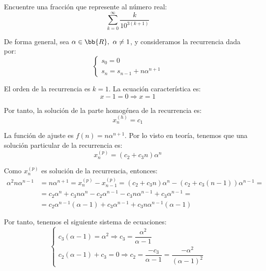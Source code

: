 \begin{ejercicio}
    Encuentre una fracción que represente al número real:
    \begin{equation*}
        \sum_{k=0}^{\infty} \dfrac{k}{10^{3(k+1)}}
    \end{equation*}

    De forma general, sea $\alpha\in \bb{R},~\alpha\neq 1$, y consideramos la recurrencia dada por:
    \begin{equation*}
        \left\{\begin{array}{l}
            s_0 = 0 \\
            s_n = s_{n-1} + n\alpha^{n+1}
        \end{array}\right.
    \end{equation*}

    El orden de la recurrencia es $k=1$. La ecuación característica es:
    \begin{equation*}
        x - 1 = 0 \Longrightarrow x = 1
    \end{equation*}

    Por tanto, la solución de la parte homogénea de la recurrencia es:
    \begin{equation*}
        x_n^{(h)} = c_1
    \end{equation*}

    La función de ajuste es $f(n) = n\alpha^{n+1}$. Por lo visto en teoría, tenemos que
    una solución particular de la recurrencia es:
    \begin{equation*}
        x_n^{(p)} = (c_2 + c_3n)\alpha^n
    \end{equation*}

    Como $x_n^{(p)}$ es solución de la recurrencia, entonces:
    \begin{align*}
        \alpha^2 n\alpha^{n-1} &=n\alpha^{n+1} = x_n^{(p)} - x_{n-1}^{(p)} = (c_2 + c_3n)\alpha^n - (c_2 + c_3(n-1))\alpha^{n-1} =\\
        &= c_2\alpha^n + c_3n\alpha^n - c_2\alpha^{n-1} - c_3n\alpha^{n-1} + c_3\alpha^{n-1} =\\
        &= c_2\alpha^{n-1}(\alpha-1) + c_3\alpha^{n-1} +c_3n\alpha^{n-1}(\alpha-1)
    \end{align*}

    Por tanto, tenemos el siguiente sistema de ecuaciones:
    \begin{equation*}
        \left\{\begin{array}{l}
            c_3(\alpha-1) = \alpha^2 \Longrightarrow c_3 = \dfrac{\alpha^2}{\alpha-1}\\
            c_2(\alpha-1) + c_3 = 0 \Longrightarrow c_2 = \dfrac{-c_3}{\alpha-1} = \dfrac{-\alpha^2}{(\alpha-1)^2}
        \end{array}\right.
    \end{equation*}


\end{ejercicio}
